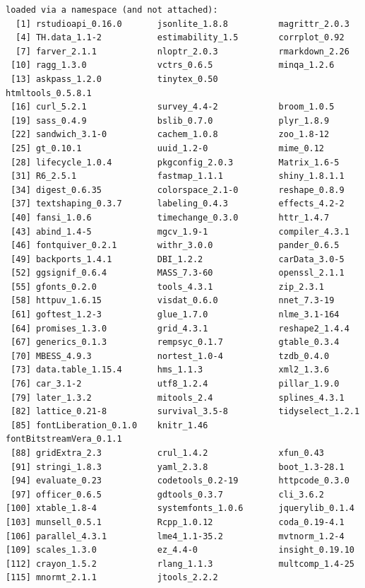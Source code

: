 \documentclass[
]{article}
\begin{document}
\begin{verbatim}
loaded via a namespace (and not attached):
  [1] rstudioapi_0.16.0       jsonlite_1.8.8          magrittr_2.0.3         
  [4] TH.data_1.1-2           estimability_1.5        corrplot_0.92          
  [7] farver_2.1.1            nloptr_2.0.3            rmarkdown_2.26         
 [10] ragg_1.3.0              vctrs_0.6.5             minqa_1.2.6            
 [13] askpass_1.2.0           tinytex_0.50            htmltools_0.5.8.1      
 [16] curl_5.2.1              survey_4.4-2            broom_1.0.5            
 [19] sass_0.4.9              bslib_0.7.0             plyr_1.8.9             
 [22] sandwich_3.1-0          cachem_1.0.8            zoo_1.8-12             
 [25] gt_0.10.1               uuid_1.2-0              mime_0.12              
 [28] lifecycle_1.0.4         pkgconfig_2.0.3         Matrix_1.6-5           
 [31] R6_2.5.1                fastmap_1.1.1           shiny_1.8.1.1          
 [34] digest_0.6.35           colorspace_2.1-0        reshape_0.8.9          
 [37] textshaping_0.3.7       labeling_0.4.3          effects_4.2-2          
 [40] fansi_1.0.6             timechange_0.3.0        httr_1.4.7             
 [43] abind_1.4-5             mgcv_1.9-1              compiler_4.3.1         
 [46] fontquiver_0.2.1        withr_3.0.0             pander_0.6.5           
 [49] backports_1.4.1         DBI_1.2.2               carData_3.0-5          
 [52] ggsignif_0.6.4          MASS_7.3-60             openssl_2.1.1          
 [55] gfonts_0.2.0            tools_4.3.1             zip_2.3.1              
 [58] httpuv_1.6.15           visdat_0.6.0            nnet_7.3-19            
 [61] goftest_1.2-3           glue_1.7.0              nlme_3.1-164           
 [64] promises_1.3.0          grid_4.3.1              reshape2_1.4.4         
 [67] generics_0.1.3          rempsyc_0.1.7           gtable_0.3.4           
 [70] MBESS_4.9.3             nortest_1.0-4           tzdb_0.4.0             
 [73] data.table_1.15.4       hms_1.1.3               xml2_1.3.6             
 [76] car_3.1-2               utf8_1.2.4              pillar_1.9.0           
 [79] later_1.3.2             mitools_2.4             splines_4.3.1          
 [82] lattice_0.21-8          survival_3.5-8          tidyselect_1.2.1       
 [85] fontLiberation_0.1.0    knitr_1.46              fontBitstreamVera_0.1.1
 [88] gridExtra_2.3           crul_1.4.2              xfun_0.43              
 [91] stringi_1.8.3           yaml_2.3.8              boot_1.3-28.1          
 [94] evaluate_0.23           codetools_0.2-19        httpcode_0.3.0         
 [97] officer_0.6.5           gdtools_0.3.7           cli_3.6.2              
[100] xtable_1.8-4            systemfonts_1.0.6       jquerylib_0.1.4        
[103] munsell_0.5.1           Rcpp_1.0.12             coda_0.19-4.1          
[106] parallel_4.3.1          lme4_1.1-35.2           mvtnorm_1.2-4          
[109] scales_1.3.0            ez_4.4-0                insight_0.19.10        
[112] crayon_1.5.2            rlang_1.1.3             multcomp_1.4-25        
[115] mnormt_2.1.1            jtools_2.2.2           
\end{verbatim}
\end{document}
